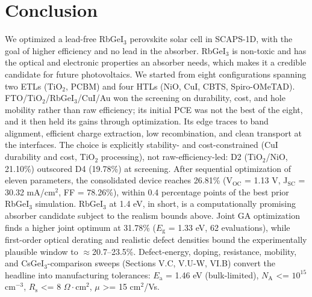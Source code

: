 \documentclass[review]{elsarticle}
\begin{document}
\section{Conclusion}
We optimized a lead-free RbGeI$_{3}$ perovskite solar cell in SCAPS-1D, with the goal of higher efficiency and no lead in the absorber. RbGeI$_{3}$ is non-toxic and has the optical and electronic properties an absorber needs, which makes it a credible candidate for future photovoltaics.
We started from eight configurations spanning two ETLs (TiO$_{2}$, PCBM) and four HTLs (NiO, CuI, CBTS, Spiro-OMeTAD). FTO/\allowbreak{}TiO$_{2}$/RbGeI$_{3}$/CuI/\allowbreak{}Au won the screening on durability, cost, and hole mobility rather than raw efficiency; its initial PCE was not the best of the eight, and it then held its gains through optimization. Its edge traces to band alignment, efficient charge extraction, low recombination, and clean transport at the interfaces. The choice is explicitly stability- and cost-constrained (CuI durability and cost, TiO$_{2}$ processing), not raw-efficiency-led: D2 (TiO$_{2}$/NiO, 21.10\%) outscored D4 (19.78\%) at screening.
After sequential optimization of eleven parameters, the consolidated device reaches 26.81\% (V$_{\mathrm{OC}}$ = 1.13 V, J$_{\mathrm{SC}}$ = 30.32 mA/cm$^{2}$, FF = 78.26\%), within 0.4 percentage points of the best prior RbGeI$_{3}$ simulation. RbGeI$_{3}$ at 1.4 eV, in short, is a computationally promising absorber candidate subject to the realism bounds above. Joint GA optimization finds a higher joint optimum at 31.78\% ($E_{\mathrm{g}}$ = 1.33 eV, 62 evaluations), while first-order optical derating and realistic defect densities bound the experimentally plausible window to $\approx$20.7--23.5\%. Defect-energy, doping, resistance, mobility, and CsGeI$_{3}$-comparison sweeps (Sections V.C, V.U-W, VI.B) convert the headline into manufacturing tolerances: $E_{\mathrm{a}}$ = 1.46 eV (bulk-limited), $N_{\mathrm{A}}$ <= $10^{15}$ cm$^{-3}$, $R_{\mathrm{s}}$ <= 8 $\Omega\cdot$cm$^{2}$, $\mu$ >= 15 cm$^{2}$/Vs.
\end{document}
